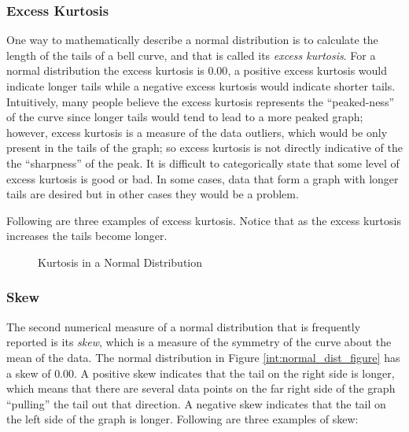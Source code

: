 \subsubsection{Excess Kurtosis}
One way to mathematically describe a normal distribution is to calculate the length of the tails of a bell curve, and that is called its \textit{excess kurtosis}. For a normal distribution the excess kurtosis is $ 0.00 $, a positive excess kurtosis would indicate longer tails while a negative excess kurtosis would indicate shorter tails. Intuitively, many people believe the excess kurtosis represents the ``peaked-ness'' of the curve since longer tails would tend to lead to a more peaked graph; however, excess kurtosis is a measure of the data outliers, which would be only present in the tails of the graph; so excess kurtosis is not directly indicative of the the ``sharpness'' of the peak. It is difficult to categorically state that some level of excess kurtosis is good or bad. In some cases, data that form a graph with longer tails are desired but in other cases they would be a problem.

Following are three examples of excess kurtosis. Notice that as the excess kurtosis increases the tails become longer. 

\begin{figure}[H]
  \begin{center}
  \end{center}
  \caption{Kurtosis in a Normal Distribution}
  \label{int:example_kurtosis}  
\end{figure}

\subsubsection{Skew}
The second numerical measure of a normal distribution that is frequently reported is its \textit{skew}, which is a measure of the symmetry of the curve about the mean of the data. The normal distribution in Figure \ref{int:normal_dist_figure} has a skew of $ 0.00 $. A positive skew indicates that the tail on the right side is longer, which means that there are several data points on the far right side of the graph ``pulling'' the tail out that direction. A negative skew indicates that the tail on the left side of the graph is longer. Following are three examples of skew:


